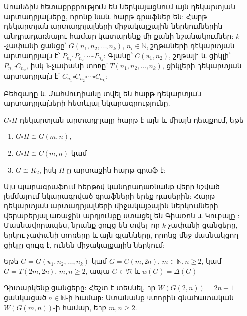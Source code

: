 
Առանձին հետաքրքրություն են ներկայացնում այն դեկարտյան արտադրյալները, որոնք նաև հարթ գրաֆներ են: Հարթ դեկարտյան արտադրյալների միջակայքային ներկումներին անդրադառնալու համար կատարենք մի քանի նշանակումներ: $k$-չափանի ցանցը՝ $G(n_{1},n_{2},\ldots,n_{k})$, $n_{i}\in \mathbb{N}$, շղթաների դեկարտյան արտադրյալն է՝ $P_{n_{1}}\square P_{n_{2}}\square\cdots\square P_{n_{k}}$: Գլանը՝ $C(n_{1},n_{2})$, շղթայի և ցիկլի՝ $P_{n_{1}}\square C_{n_{2}}$, իսկ k-չափանի տոռը՝ $T(n_{1},n_{2},\ldots,n_{k})$, ցիկլերի դեկարտյան արտադրյալն է՝ $C_{n_{1}}\square C_{n_{2}}\square\cdots\square C_{n_{k}}$:

Բեհզադը և Մահմուդիանը \cite{BehzadMahmoodian1969} տվել են հարթ դեկարտյան արտադրյալների հետևյալ նկարագրությունը.

\begin{lemma}
\label{t2_behzad} $G \square H$ դեկարտյան արտադրյալը հարթ է այն և միայն դեպքում, եթե
\begin{enumerate}
    \item $G\square H \cong G(m,n)$,
    \item $G\square H \cong C(m,n)$ կամ
    \item $G \cong K_2$, իսկ $H$-ը արտաքին հարթ գրաֆ է:
\end{enumerate}
\end{lemma}

Այս պարագրաֆում հերթով կանդրադառնանք վերը նշված լեմմայում նկարագրված գրաֆների երեք դասերին: Հարթ դեկարտյան արտադրյալների միջակայքային ներկումների վերաբերյալ առաջին արդյունքը ստացել են Գիառոն և Կուբալը \cite{GiaroKubale1997}: Մասնավորապես, նրանք ցույց են տվել, որ $k$-չափանի ցանցերը, երկու չափանի տոռերը և այն գլանները, որոնց մեջ մասնակցող ցիկլը զույգ է, ունեն միջակայքային ներկում:

\begin{theorem}
\label{t2_Giaro_w} Եթե $G=G(n_{1},n_{2},\ldots,n_{k})$ կամ $G=C(m,2n)$, $m\in \mathbb{N}, n\geq 2$, կամ $G=T(2m,2n)$, $m,n\geq 2$, ապա $G\in \mathfrak{N}$ և $w(G)=\Delta(G)$:
\end{theorem}

Դիտարկենք ցանցերը: Հեշտ է տեսնել, որ $W\left(G(2,n)\right)=2n-1$ ցանկացած $n\in \mathbb{N}$-ի համար: Ստանանք ստորին գնահատական $W\left(G(m,n)\right)$-ի համար, երբ $m,n\geq 2$.

